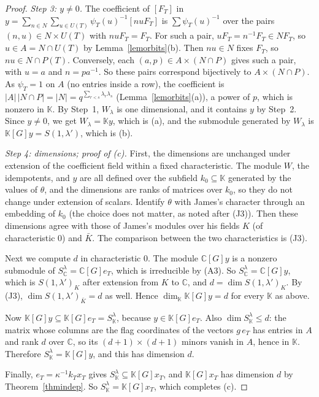 \documentclass[11pt, letterpaper]{amsart}
\theoremstyle{definition}
\theoremstyle{remark}
\newcommand{\KK}{\mathbb{K}}
\newcommand{\CC}{\mathbb{C}}
\begin{document}
\begin{proof}
\emph{Step 3: $y\ne0$.} The coefficient of $[F_T]$ in $y=\sum_{n\in N}\sum_{u\in U(T)}\psi_T(u)^{-1}[nuF_T]$ is $\sum\psi_T(u)^{-1}$ over the pairs $(n,u)\in N\times U(T)$ with $nuF_T=F_T$. For such a pair, $uF_T=n^{-1}F_T\in NF_T$, so $u\in A=N\cap U(T)$ by Lemma~\ref{lemorbits}(b). Then $nu\in N$ fixes $F_T$, so $nu\in N\cap P(T)$. Conversely, each $(a,p)\in A\times(N\cap P)$ gives such a pair, with $u=a$ and $n=pa^{-1}$. So these pairs correspond bijectively to $A\times(N\cap P)$. As $\psi_T=1$ on $A$ (no entries inside a row), the coefficient is $|A|\,|N\cap P|=|N|=q^{\sum_{r<s}\lambda_r\lambda_s}$ (Lemma~\ref{lemorbits}(a)), a power of $p$, which is nonzero in $\KK$. By Step~1, $W_\lambda$ is one dimensional, and it contains $y$ by Step~2. Since $y\ne0$, we get $W_\lambda=\KK y$, which is (a), and the submodule generated by $W_\lambda$ is $\KK[G]y=S(1,\lambda')$, which is (b).

\emph{Step 4: dimensions; proof of (c).} First, the dimensions are unchanged under extension of the coefficient field within a fixed characteristic. The module $W$, the idempotents, and $y$ are all defined over the subfield $k_0\subseteq\KK$ generated by the values of $\theta$, and the dimensions are ranks of matrices over $k_0$, so they do not change under extension of scalars. Identify $\theta$ with James's character through an embedding of $k_0$ (the choice does not matter, as noted after (J3)). Then these dimensions agree with those of James's modules over his fields $K$ (of characteristic $0$) and $\bar K$. The comparison between the two characteristics is (J3).

Next we compute $d$ in characteristic $0$. The module $\CC[G]y$ is a nonzero submodule of $S^\lambda_\CC=\CC[G]e_T$, which is irreducible by (A3). So $S^\lambda_\CC=\CC[G]y$, which is $S(1,\lambda')_K$ after extension from $K$ to $\CC$, and $d=\dim S(1,\lambda')_K$. By (J3), $\dim S(1,\lambda')_{\bar K}=d$ as well. Hence $\dim_\KK\KK[G]y=d$ for every $\KK$ as above.

Now $\KK[G]y\subseteq\KK[G]e_T=S^\lambda_\KK$, because $y\in\KK[G]e_T$. Also $\dim S^\lambda_\KK\le d$: the matrix whose columns are the flag coordinates of the vectors $g\,e_T$ has entries in $A$ and rank $d$ over $\CC$, so its $(d+1)\times(d+1)$ minors vanish in $A$, hence in $\KK$. Therefore $S^\lambda_\KK=\KK[G]y$, and this has dimension $d$.

Finally, $e_T=\kappa^{-1}k_Tx_T$ gives $S^\lambda_\KK\subseteq\KK[G]x_T$, and $\KK[G]x_T$ has dimension $d$ by Theorem~\ref{thmindep}. So $S^\lambda_\KK=\KK[G]x_T$, which completes (c).


\end{proof}
\end{document}

